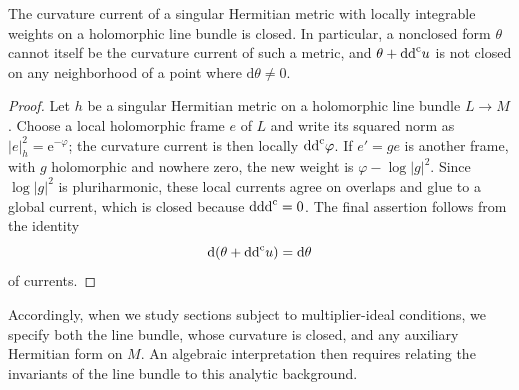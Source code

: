 \begin{proposition}\label{prop:chern-closed}
The curvature current of a singular Hermitian metric with locally integrable weights on a holomorphic line bundle is closed. In particular, a nonclosed form $\theta$ cannot itself be the curvature current of such a metric, and $\theta+\mathrm{dd}^{\mathrm{c}} u$ is not closed on any neighborhood of a point where $\mathrm{d}\theta\neq0$.
\end{proposition}
\begin{proof}
Let $h$ be a singular Hermitian metric on a holomorphic line bundle $L\to M$. Choose a local holomorphic frame $e$ of $L$ and write its squared norm as $|e|_h^2=\mathrm{e}^{-\varphi}$; the curvature current is then locally $\mathrm{dd}^{\mathrm{c}}\varphi$. If $e'=ge$ is another frame, with $g$ holomorphic and nowhere zero, the new weight is $\varphi-\log|g|^2$. Since $\log|g|^2$ is pluriharmonic, these local currents agree on overlaps and glue to a global current, which is closed because $\mathrm{d}\mathrm{dd}^{\mathrm{c}}=0$. The final assertion follows from the identity
\[
 \mathrm{d}(\theta+\mathrm{dd}^{\mathrm{c}} u)=\mathrm{d}\theta
\]
of currents.
\end{proof}

Accordingly, when we study sections subject to multiplier-ideal conditions, we specify both the line bundle, whose curvature is closed, and any auxiliary Hermitian form on $M$. An algebraic interpretation then requires relating the invariants of the line bundle to this analytic background.


